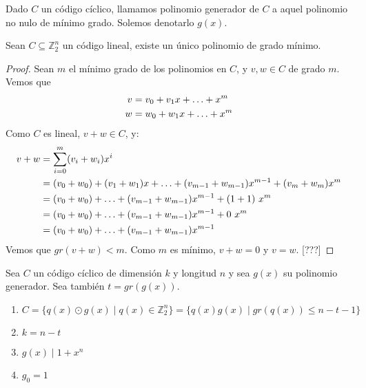 \begin{definition}
Dado $C$ un código cíclico, llamamos polinomio generador de $C$ a aquel polinomio no nulo de mínimo grado. Solemos denotarlo $g(x)$.
\end{definition}

\begin{proposition}
Sean $C \subseteq{\mathbb{Z}_2^n}$ un código lineal, existe un único polinomio de grado mínimo.
\end{proposition}
\begin{proof}
Sean $m$ el mínimo grado de los polinomios en $C$, y $v, w \in C$ de grado $m$. Vemos que
\begin{align}
    v &= v_0 + v_1 x + \mathellipsis + x^m\\
    w &= w_0 + w_1 x + \mathellipsis + x^m
\end{align}
Como $C$ es lineal, $v+w \in C$, y:
\begin{align}
    v + w &= \sum_{i=0}^m (v_i + w_i) x^i\\
    &= (v_0 + w_0) + (v_1 + w_1) x + \mathellipsis + (v_{m-1} + w_{m-1}) x^{m-1} + (v_m + w_m) x^m\\
    &= (v_0 + w_0) + \mathellipsis + (v_{m-1} + w_{m-1}) x^{m-1} + (1 + 1)~x^m\\
    &= (v_0 + w_0) + \mathellipsis + (v_{m-1} + w_{m-1}) x^{m-1} + 0~x^m\\
    &= (v_0 + w_0) + \mathellipsis + (v_{m-1} + w_{m-1}) x^{m-1}
\end{align}
Vemos que $gr(v+w) < m$. Como $m$ es mínimo, $v+w = 0$ y $v = w$. [???]
\end{proof}

\begin{theorem}
Sea $C$ un código cíclico de dimensión $k$ y longitud $n$ y sea $g(x)$ su polinomio generador. Sea también $t = gr(g(x))$.
\begin{enumerate}
    \item $C = \{ q(x) \odot g(x) \mid q(x) \in \mathbb{Z}_2^n\} = \{ q(x)g(x) \mid gr(q(x)) \le n - t - 1 \}$
    \item $k = n - t$
    \item $g(x) \mid 1+x^n$
    \item $g_0 = 1$
\end{enumerate}
\end{theorem}

